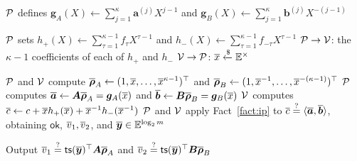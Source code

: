 \begin{algorithm}[!t]
\caption{Packed inner-product proof}
\label{alg:ip}

\(\mathcal{P}\) defines
\(\bm g_A(X)\leftarrow\sum_{j=1}^{\kappa}\bm a^{(j)}X^{j-1}\)
and
\(\bm g_B(X)\leftarrow\sum_{j=1}^{\kappa}\bm b^{(j)}X^{-(j-1)}\)\;

\(\mathcal{P}\) sets
\(h_+(X)\leftarrow\sum_{\tau=1}^{\kappa-1}f_\tau X^{\tau-1}\)
and
\(h_-(X)\leftarrow\sum_{\tau=1}^{\kappa-1}f_{-\tau}X^{\tau-1}\)\;
\({\mathcal{P} \rightarrow \mathcal{V}}\): the \(\kappa-1\) coefficients of each of \(h_+\) and \(h_-\)\;
\({\mathcal{V} \rightarrow \mathcal{P}}\): \(\overline{x}\mathrel{\xleftarrow{\$}}\mathbb{E}^\times\)\;

\(\mathcal{P}\) and \(\mathcal{V}\) compute
\(\overline{\bm\rho}_A\leftarrow(1,\overline{x},\ldots,\overline{x}^{\kappa-1})^\top\)
and
\(\overline{\bm\rho}_B\leftarrow(1,\overline{x}^{-1},\ldots,\overline{x}^{-(\kappa-1)})^\top\)\;
\(\mathcal{P}\) computes
\(\overline{\bm a}\leftarrow\bm A\overline{\bm\rho}_A=\bm g_A(\overline{x})\)
and
\(\overline{\bm b}\leftarrow\bm B\overline{\bm\rho}_B=\bm g_B(\overline{x})\)\;
\(\mathcal{V}\) computes
\(\overline{c}\leftarrow
c+\overline{x} h_+(\overline{x})+\overline{x}^{-1}h_-(\overline{x}^{-1})\)\;
\(\mathcal{P}\) and \(\mathcal{V}\) apply Fact~\ref{fact:ip} to
\(\overline{c}\mathrel{\overset{\mathrm{?}}{=}}\langle\overline{\bm a},\overline{\bm b}\rangle\),
obtaining \(\mathsf{ok}\), \(\overline{v}_1,\overline{v}_2\), and
\(\overline{\bm y}\in\mathbb{E}^{\log_2m}\)\;

Output
\(\overline{v}_1\mathrel{\overset{\mathrm{?}}{=}}
{\sf ts}(\overline{\bm y})^\top\bm A\overline{\bm\rho}_A\)
and
\(\overline{v}_2\mathrel{\overset{\mathrm{?}}{=}}
{\sf ts}(\overline{\bm y})^\top\bm B\overline{\bm\rho}_B\)\;
\;
\end{algorithm}

